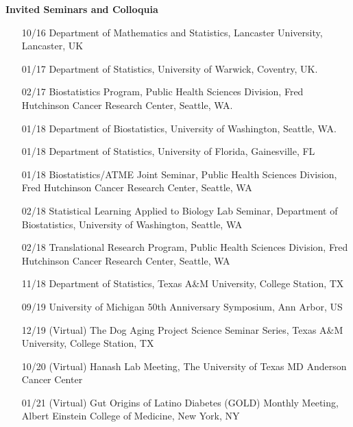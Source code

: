 \documentclass[10pt]{article}
\begin{document}
\textbf{Invited Seminars and Colloquia}
\begin{enumerate}\setcounter{enumi}{14}
\item[10/16] Department of Mathematics and Statistics, Lancaster University, Lancaster, UK
\item[01/17] Department of Statistics, University of Warwick, Coventry, UK. 
\item[02/17] Biostatistics Program, Public Health Sciences Division, Fred Hutchinson Cancer Research Center, Seattle, WA.
\item[01/18] Department of Biostatistics, University of Washington, Seattle, WA.
\item[01/18] Department of Statistics, University of Florida, Gainesville, FL
\item[01/18] Biostatistics/ATME Joint Seminar, Public Health Sciences Division, Fred Hutchinson Cancer Research Center, Seattle, WA
\item[02/18] Statistical Learning Applied to Biology Lab Seminar, Department of Biostatistics, University of Washington, Seattle, WA
\item[02/18] Translational Research Program, Public Health Sciences Division, Fred Hutchinson Cancer Research Center, Seattle, WA
\item[11/18] Department of Statistics, Texas A\&M University, College Station, TX
\item[09/19] University of Michigan 50th Anniversary Symposium, Ann Arbor, US
\item[12/19] (Virtual) The Dog Aging Project Science Seminar Series, Texas A\&M University, College Station, TX
\item[10/20] (Virtual) Hanash Lab Meeting, The University of Texas MD Anderson Cancer Center
\item[01/21] (Virtual) Gut Origins of Latino Diabetes (GOLD) Monthly Meeting, Albert Einstein College of Medicine, New York, NY

\end{enumerate}
\end{document}
